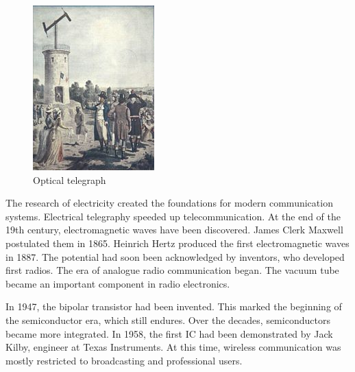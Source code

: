 \begin{refsection}
\begin{minipage}{0.45\linewidth}
\begin{figure}[H]
		\includegraphics[width=\linewidth]{../chapter00/OpticalTelegraph.jpg}
		\caption[Optical telegraph]{Optical telegraph \cite{WikiSemaphore}}
	\end{figure}
\end{minipage}

The research of electricity created the foundations for modern communication systems. Electrical telegraphy speeded up telecommunication. At the end of the 19th century, electromagnetic waves have been discovered. James Clerk Maxwell postulated them in 1865. Heinrich Hertz produced the first electromagnetic waves in 1887. The potential had soon been acknowledged by inventors, who developed first radios. The era of analogue radio communication began. The  vacuum tube became an important component in radio electronics.

In 1947, the bipolar transistor had been invented. This marked the beginning of the semiconductor era, which still endures. Over the decades, semiconductors became more integrated. In 1958, the first \ac{IC} had been demonstrated by Jack Kilby, engineer at Texas Instruments. At this time, wireless communication was mostly restricted to broadcasting and professional users.


\end{refsection}
